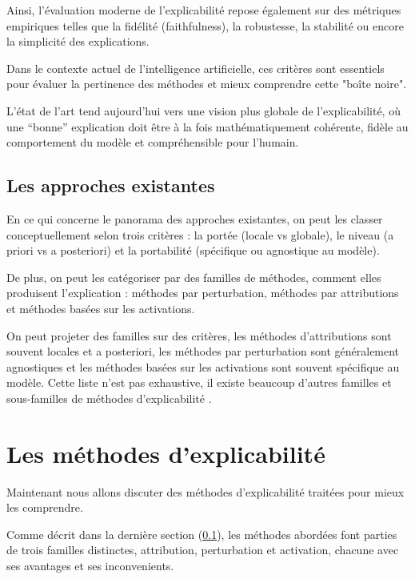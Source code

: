 \documentclass{ir}
\begin{document}
Ainsi, l'évaluation moderne de l'explicabilité repose également sur des métriques empiriques telles que la fidélité (faithfulness), la robustesse, la stabilité ou encore la simplicité des explications.

Dans le contexte actuel de l'intelligence artificielle, ces critères sont essentiels pour évaluer la pertinence des méthodes et mieux comprendre cette "boîte noire".

L'état de l'art tend aujourd'hui vers une vision plus globale de l'explicabilité, où une “bonne” explication doit être à la fois mathématiquement cohérente, fidèle au comportement du modèle et compréhensible pour l'humain.

\subsection{Les approches existantes}\label{subsec:approches_existantes}

En ce qui concerne le panorama des approches existantes, on peut les classer conceptuellement selon trois critères : la portée (locale vs globale), le niveau (a priori vs a posteriori) et la portabilité (spécifique ou agnostique au modèle).

De plus, on peut les catégoriser par des familles de méthodes, comment elles produisent l'explication : méthodes par perturbation, méthodes par attributions et méthodes basées sur les activations.

On peut projeter des familles sur des critères, les méthodes d'attributions sont souvent locales et a posteriori, les méthodes par perturbation sont généralement agnostiques et les méthodes basées sur les activations sont souvent spécifique au modèle.
Cette liste n'est pas exhaustive, il existe beaucoup d'autres familles et sous-familles de méthodes d'explicabilité \cite{Kadir2023XAIEvaluation}.


\section{Les méthodes d'explicabilité}\label{sec.methodesexplicabilite}

Maintenant nous allons discuter des méthodes d'explicabilité traitées pour mieux les comprendre.

Comme décrit dans la dernière section (\ref{subsec:approches_existantes}), les méthodes abordées font parties de trois familles distinctes, attribution, perturbation et activation, chacune avec ses avantages et ses inconvenients.
\end{document}
